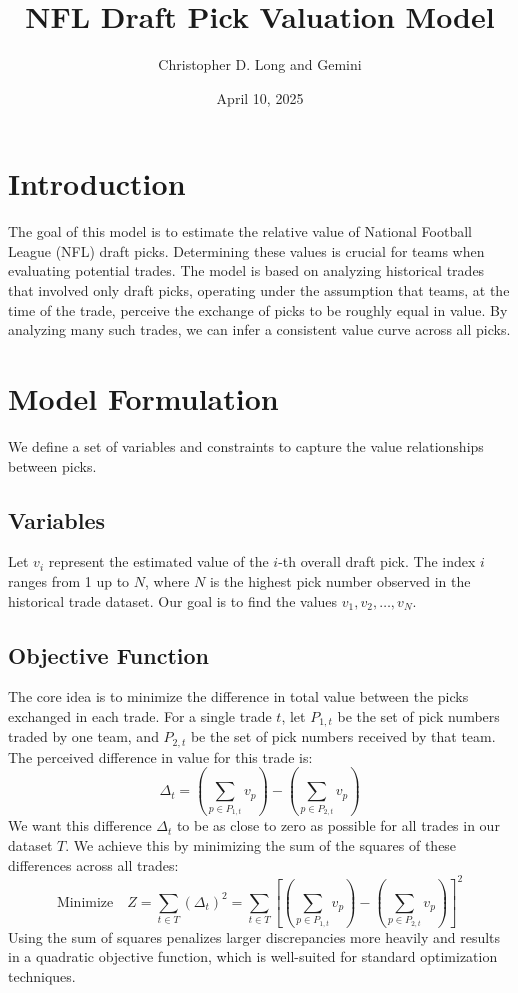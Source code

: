\documentclass{article}
\title{NFL Draft Pick Valuation Model}
\author{Christopher D. Long and Gemini}
\date{April 10, 2025} %
\begin{document}
\maketitle

\section{Introduction}

The goal of this model is to estimate the relative value of National Football League (NFL) draft picks. Determining these values is crucial for teams when evaluating potential trades. The model is based on analyzing historical trades that involved only draft picks, operating under the assumption that teams, at the time of the trade, perceive the exchange of picks to be roughly equal in value. By analyzing many such trades, we can infer a consistent value curve across all picks.

\section{Model Formulation}

We define a set of variables and constraints to capture the value relationships between picks.

\subsection{Variables}
Let $v_i$ represent the estimated value of the $i$-th overall draft pick. The index $i$ ranges from 1 up to $N$, where $N$ is the highest pick number observed in the historical trade dataset. Our goal is to find the values $v_1, v_2, \dots, v_N$.

\subsection{Objective Function}
The core idea is to minimize the difference in total value between the picks exchanged in each trade. For a single trade $t$, let $P_{1,t}$ be the set of pick numbers traded by one team, and $P_{2,t}$ be the set of pick numbers received by that team. The perceived difference in value for this trade is:
\[
\Delta_t = \left( \sum_{p \in P_{1,t}} v_p \right) - \left( \sum_{p \in P_{2,t}} v_p \right)
\]
We want this difference $\Delta_t$ to be as close to zero as possible for all trades in our dataset $T$. We achieve this by minimizing the sum of the squares of these differences across all trades:
\[
\text{Minimize} \quad Z = \sum_{t \in T} (\Delta_t)^2 = \sum_{t \in T} \left[ \left( \sum_{p \in P_{1,t}} v_p \right) - \left( \sum_{p \in P_{2,t}} v_p \right) \right]^2
\]
Using the sum of squares penalizes larger discrepancies more heavily and results in a quadratic objective function, which is well-suited for standard optimization techniques.
\end{document}
